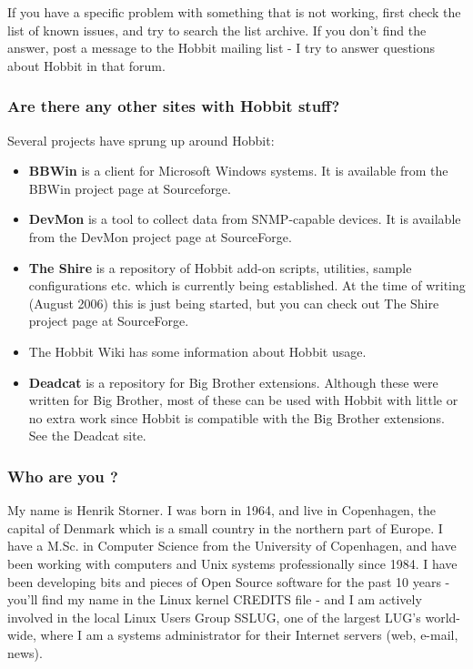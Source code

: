  If you have a specific problem with something that is not working, first check the list of known issues, and try to search the list archive. If you don't find the answer, post a message to the Hobbit mailing list - I try to answer questions about Hobbit in that forum.
\subsubsection{Are there any other sites with Hobbit stuff?}


 Several projects have sprung up around Hobbit:
\begin{itemize}
\item \textbf{BBWin}
 is a client for Microsoft Windows systems. It is available from the BBWin project page at Sourceforge.
\item \textbf{DevMon}
 is a tool to collect data from SNMP-capable devices. It is available from the DevMon project page at SourceForge.
\item \textbf{The Shire}
 is a repository of Hobbit add-on scripts, utilities, sample configurations etc. which is currently being established. At the time of writing (August 2006) this is just being started, but you can check out The Shire project page at SourceForge.
\item The Hobbit Wiki has some information about Hobbit usage.
\item \textbf{Deadcat}
 is a repository for Big Brother extensions. Although these were written for Big Brother, most of these can be used with Hobbit with little or no extra work since Hobbit is compatible with the Big Brother extensions. See the Deadcat site.

\end{itemize}
\subsubsection{Who are you ?}


 My name is Henrik Storner. I was born in 1964, and live in Copenhagen, the capital of Denmark which is a small country in the northern part of Europe. I have a M.Sc. in Computer Science from the University of Copenhagen, and have been working with computers and Unix systems professionally since 1984. I have been developing bits and pieces of Open Source software for the past 10 years - you'll find my name in the Linux kernel CREDITS file - and I am actively involved in the local Linux Users Group SSLUG, one of the largest LUG's world-wide, where I am a systems administrator for their Internet servers (web, e-mail, news).


